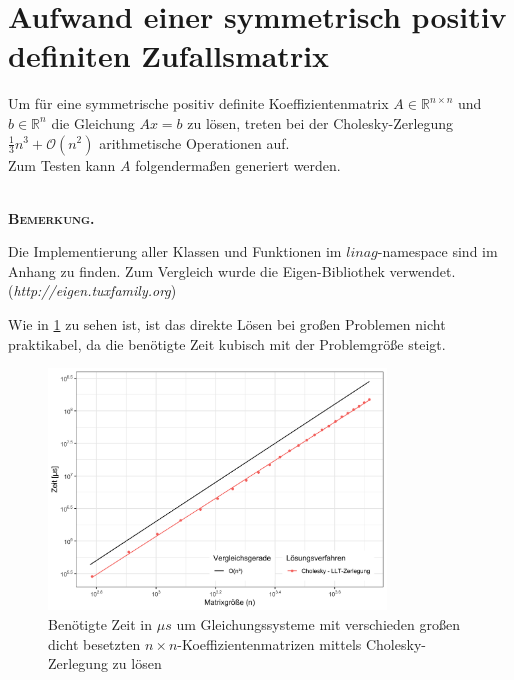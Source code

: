 \documentclass[12pt,a4paper]{scrartcl}
\numberwithin{equation}{section}
\numberwithin{myalgctr}{section}
\numberwithin{mytheoremctr}{subsection}
\numberwithin{mykorollarctr}{subsection}
\numberwithin{mylemmactr}{subsection}
\numberwithin{mybeispielctr}{subsection}
\newenvironment{bemerkung}{%
	\bigskip\noindent%
	\textsc{\textbf{\\Bemerkung.}}%
	\indent
}{\par\bigskip}  %
\begin{document}
	\section{Aufwand einer symmetrisch positiv definiten Zufallsmatrix}
	Um für eine symmetrische positiv definite Koeffizientenmatrix $A\in\mathbb{R}^{n\times n}$ und $b \in \mathbb{R}^{n}$ die Gleichung $Ax = b$ zu lösen, treten bei der Cholesky-Zerlegung $\frac{1}{3}n^{3} + \mathcal{O}(n^{2})$ arithmetische Operationen auf. \\
	Zum Testen kann $A$ folgendermaßen generiert werden. 
	
	
	 
	
	\begin{bemerkung}
		Die Implementierung aller Klassen und Funktionen im $linag$-namespace sind im Anhang zu finden. Zum Vergleich wurde die Eigen-Bibliothek verwendet. (\textit{http://eigen.tuxfamily.org}) 
	\end{bemerkung}
	
	Wie in \cref{fig:zeiteigensolver} zu sehen ist, ist das direkte Lösen bei großen Problemen nicht praktikabel, da die benötigte Zeit kubisch mit der Problemgröße steigt. 
	
	\begin{figure}[H]
		\begin{center}
			\includegraphics[width=0.8\textwidth]{../plots/eigen.png}
		\end{center}
		\caption{Ben\"otigte Zeit in $\mu s$ um Gleichungssysteme mit verschieden gro\ss en dicht besetzten $n\times n$-Koeffizientenmatrizen mittels Cholesky-Zerlegung zu l\"osen}
		\label{fig:zeiteigensolver}	
	\end{figure}
	
\end{document}
